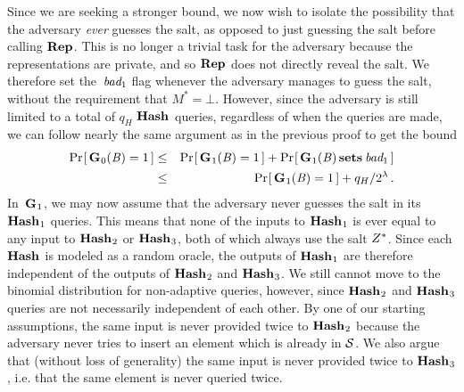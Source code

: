 Since we are seeking a stronger bound, we now wish to isolate the possibility
that the adversary \emph{ever} guesses the salt, as opposed to just guessing the
salt before calling $\textup{\textbf{Rep}}\hspace{0.5pt}$. This is no longer a trivial task for the adversary
because the representations are private, and so $\textup{\textbf{Rep}}\hspace{0.5pt}$ does not directly reveal
the salt. We therefore set the~$\textit{bad}_1$ flag whenever the adversary manages to
guess the salt, without the requirement that $M^* = \bot$. However, since the
adversary is still limited to a total of $q_H$ $\textup{\textbf{Hash}}\hspace{0.5pt}$ queries, regardless of
when the queries are made, we can follow nearly the same argument as in the
previous proof to get the bound
%
\begin{eqnarray}
  \Pr\hspace{-1pt}\left[\,\textup{\textbf{G}}\hspace{0.5pt}_0(\mathit{B})=1\,\right] &\leq&
    \Pr\hspace{-1pt}\left[\,\textup{\textbf{G}}\hspace{0.5pt}_1(\mathit{B})=1\,\right] + \Pr\hspace{-1pt}\left[\,\textup{\textbf{G}}\hspace{0.5pt}_1(\mathit{B}) \,\textup{\textbf{sets}}\hspace{0.5pt}\, \textit{bad}_1\,\right]\\
  &\leq&
    \Pr\hspace{-1pt}\left[\,\textup{\textbf{G}}\hspace{0.5pt}_1(\mathit{B})=1\,\right] + q_H/2^\lambda \,.
\end{eqnarray}
%
In~$\textup{\textbf{G}}\hspace{0.5pt}_1$, we may now assume that the adversary never guesses the salt in its $\textup{\textbf{Hash}}\hspace{0.5pt}_1$ queries. This means that none of the inputs to $\textup{\textbf{Hash}}\hspace{0.5pt}_1$ is ever equal to any input to $\textup{\textbf{Hash}}\hspace{0.5pt}_2$ or $\textup{\textbf{Hash}}\hspace{0.5pt}_3$, both of which always use the salt $Z^*$. Since each $\textup{\textbf{Hash}}\hspace{0.5pt}$ is modeled as a random oracle, the outputs of $\textup{\textbf{Hash}}\hspace{0.5pt}_1$ are therefore independent of the outputs of $\textup{\textbf{Hash}}\hspace{0.5pt}_2$ and $\textup{\textbf{Hash}}\hspace{0.5pt}_3$.
%
We still cannot move to the binomial distribution for non-adaptive queries,
however, since $\textup{\textbf{Hash}}\hspace{0.5pt}_2$ and $\textup{\textbf{Hash}}\hspace{0.5pt}_3$ queries are not necessarily independent
of each other. By one of our starting assumptions, the same input is never
provided twice to $\textup{\textbf{Hash}}\hspace{0.5pt}_2$ because the adversary never tries to insert an
element which is already in $\mathcal{S}$. We also argue  that (without loss of
generality) the same input is never provided twice to $\textup{\textbf{Hash}}\hspace{0.5pt}_3$, i.e. that the
same element is never queried twice.


